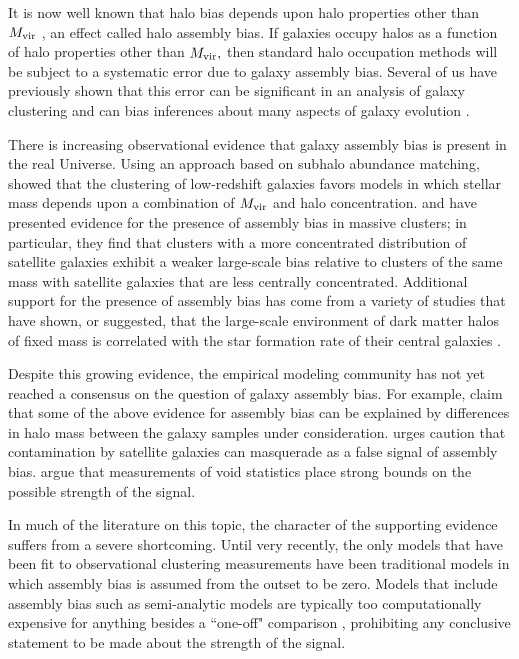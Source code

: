 \documentclass[usenatbib,usegraphicx,letterpaper]{mn2e}
\newcommand{\mvir}{M_{\rm vir}}
\begin{document}
It is now well known that halo bias depends upon halo properties other than $\mvir$
\citep[e.g.][]{gao_etal05,wechsler06,gao_white07,zentner07,dalal_etal08,lacerna11},
an effect called halo assembly bias. If galaxies occupy halos as a
function of halo properties other than $\mvir,$ then standard halo
occupation methods will be subject to a systematic error due to galaxy
assembly bias. 
Several of us have previously shown that this error can
be significant in an analysis of galaxy clustering and can bias
inferences about many aspects of galaxy evolution
\citep{zentner_etal14}. 


There is increasing observational evidence that galaxy assembly bias is 
present in the real Universe. 
Using an approach based on subhalo abundance matching, 
\citet{lehmann_etal15} showed that the clustering of low-redshift 
galaxies favors models in which stellar mass depends upon a 
combination of $\mvir$ and halo concentration.
\citet{miyatake_etal16} and \citet{more_etal16} have 
presented evidence for the presence of assembly bias in massive
clusters; in particular, they find that clusters with a more
concentrated distribution of satellite galaxies exhibit a weaker large-scale bias 
relative to clusters of the same mass with satellite galaxies that
are less centrally concentrated. 
Additional support for the presence of assembly bias has come from a
variety of studies that have shown, or suggested, that the large-scale
environment of dark matter halos of fixed mass 
is correlated with the star formation rate of their central galaxies 
\citep{yang_etal06a, blanton_berlind07,wang_etal08,wang_etal13,hearin_etal14}. 

Despite this growing evidence, the empirical modeling community 
has not yet reached a consensus on the question of galaxy assembly bias. 
For example, \citet{lin_mandelbaum_etal15} claim that 
some of the above evidence for assembly bias can be explained by
differences in halo mass between the galaxy samples under consideration.
\citet{paranjape15} urges caution that contamination by satellite galaxies 
can masquerade as a false signal of assembly bias. 
\citet{tinker08b} argue that measurements of void statistics place strong 
bounds on the possible strength of the signal. 

In much of the literature on this topic, 
the character of the supporting evidence
suffers from a severe shortcoming. 
Until very recently, the only models that have been fit to 
observational clustering measurements have been traditional models 
in which assembly bias is assumed from the outset to be zero. 
Models that include assembly bias such as semi-analytic models 
are typically too computationally expensive 
for anything besides a ``one-off" comparison \citep[e.g.,][]{croton_etal07}, prohibiting 
any conclusive statement to be made about the strength of the signal.
\end{document}
